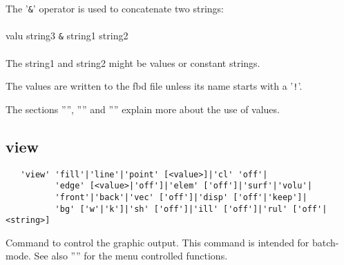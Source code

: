 \documentclass{article}
\begin{document}
The '\verb_&_' operator is used to concatenate two strings:\\\\valu string3 \verb_&_ string1 string2\\\\The string1 and string2 might be values or constant strings.

The values are written to the fbd file unless its name starts with a '\verb_!_'. 

The sections '''', '''' and '''' explain more about the use of values.

\subsection{\label{view}view}
\begin{verbatim}
   'view' 'fill'|'line'|'point' [<value>]|'cl' 'off'|
          'edge' [<value>|'off']|'elem' ['off']|'surf'|'volu'|
          'front'|'back'|'vec' ['off']|'disp' ['off'|'keep']|
          'bg' ['w'|'k']|'sh' ['off']|'ill' ['off']|'rul' ['off'|<string>]
\end{verbatim}
Command to control the graphic output. This command is intended for batch-mode. See also '''' for the menu controlled functions.
\end{document}
